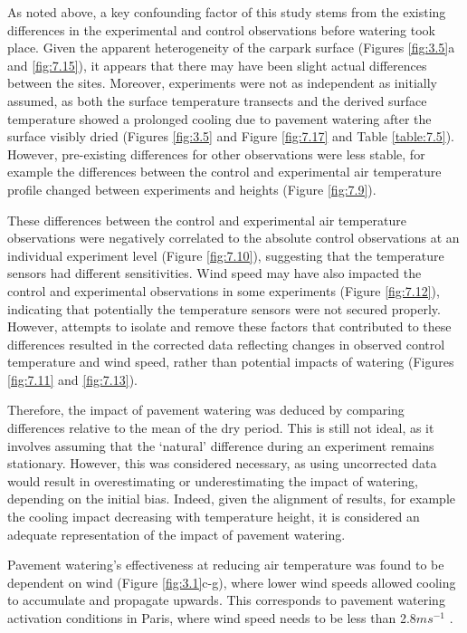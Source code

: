 \documentclass[final,3p,times,authoryear]{elsarticle}
\begin{document}
As noted above, a key confounding factor of this study stems from the existing differences in the experimental and control observations before watering took place. Given the apparent heterogeneity of the carpark surface (Figures \ref{fig:3.5}a and \ref{fig:7.15}), it appears that there may have been slight actual differences between the sites. Moreover, experiments were not as independent as initially assumed, as both the surface temperature transects and the derived surface temperature showed a prolonged cooling due to pavement watering after the surface visibly dried (Figures \ref{fig:3.5} and Figure \ref{fig:7.17} and Table \ref{table:7.5}). However, pre-existing differences for other observations were less stable, for example the differences between the control and experimental air temperature profile changed between experiments and heights (Figure \ref{fig:7.9}).

These differences between the control and experimental air temperature observations were negatively correlated to the absolute control observations at an individual experiment level (Figure \ref{fig:7.10}), suggesting that the temperature sensors had different sensitivities. Wind speed may have also impacted the control and experimental observations in some experiments (Figure \ref{fig:7.12}), indicating that potentially the temperature sensors were not secured properly. However, attempts to isolate and remove these factors that contributed to these differences resulted in the corrected data reflecting changes in observed control temperature and wind speed, rather than potential impacts of watering (Figures \ref{fig:7.11} and \ref{fig:7.13}).

Therefore, the impact of pavement watering was deduced by comparing differences relative to the mean of the dry period. This is still not ideal, as it involves assuming that the `natural' difference during an experiment remains stationary. However, this was considered necessary, as using uncorrected data would result in overestimating or underestimating the impact of watering, depending on the initial bias. Indeed, given the alignment of results, for example the cooling impact decreasing with temperature height, it is considered an adequate representation of the impact of pavement watering.

Pavement watering's effectiveness at reducing air temperature was found to be dependent on wind (Figure \ref{fig:3.1}c-g), where lower wind speeds allowed cooling to accumulate and propagate upwards. This corresponds to pavement watering activation conditions in Paris, where wind speed needs to be less than 2.8$ms^{-1}$ \citep{Hendel2015a}.
\end{document}
